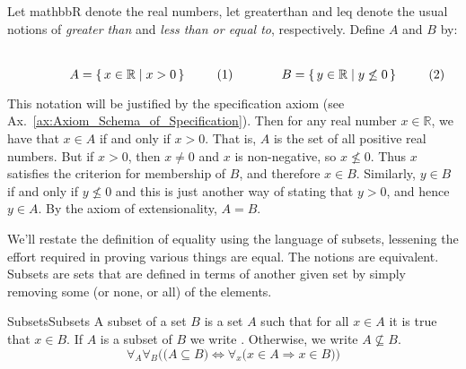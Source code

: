         \begin{example}
            Let \gls{mathbbR} denote the real numbers, let \gls{greaterthan} and
            \gls{leq} denote the usual notions of \textit{greater than} and
            \textit{less than or equal to}, respectively. Define $A$ and $B$ by:
            \par
            \begin{subequations}
                \begin{minipage}[b]{0.49\textwidth}
                    \centering
                    \begin{equation}
                        A=\{\,x\in\mathbb{R}\;|\;x>0\,\}
                    \end{equation}
                \end{minipage}
                \hfill
                \begin{minipage}[b]{0.49\textwidth}
                    \centering
                    \begin{equation}
                        B=\{\,y\in\mathbb{R}\;|\;y\not\leq{0}\,\}
                    \end{equation}
                \end{minipage}
            \end{subequations}
            \par\vspace{2.5ex}
            This notation will be justified by the specification axiom
            (see Ax.~\ref{ax:Axiom_Schema_of_Specification}). Then for any real
            number $x\in\mathbb{R}$, we have that $x\in{A}$ if and only if
            $x>0$. That is, $A$ is the set of all positive real numbers. But if
            $x>0$, then $x\ne{0}$ and $x$ is non-negative, so $x\not\leq{0}$.
            Thus $x$ satisfies the criterion for membership of $B$, and
            therefore $x\in{B}$. Similarly, $y\in{B}$ if and only if
            $y\not\leq{0}$ and this is just another way of stating that $y>0$,
            and hence $y\in{A}$. By the axiom of extensionality, $A=B$.
        \end{example}
        We'll restate the definition of equality using the
        language of subsets, lessening the effort required in
        proving various things are equal. The notions are equivalent. Subsets
        are sets that are defined in terms of another given set by simply
        removing some (or none, or all) of the elements.
        \begin{fdefinition}{Subsets}{Subsets}
            A \gls{subset} of a \gls{set} $B$ is a set $A$ such that for all
            $x\in{A}$ it is true that $x\in{B}$. If $A$ is a subset of $B$ we
            write . Otherwise, we write
            $A\nsubseteq{B}$.
            \begin{equation*}
                \forall_{A}\forall_{B}\Big(\big(A\subseteq{B}\big)
                \Longleftrightarrow
                \forall_{x}\big(x\in{A}\Rightarrow{x}\in{B}\big)\Big)
            \end{equation*}
        \end{fdefinition}
